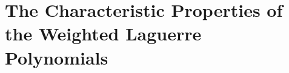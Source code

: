 \documentclass[conference, a4paper]{IEEEtran}
\begin{document}
%



%

\section{The Characteristic Properties of the Weighted Laguerre
Polynomials}
\end{document}
